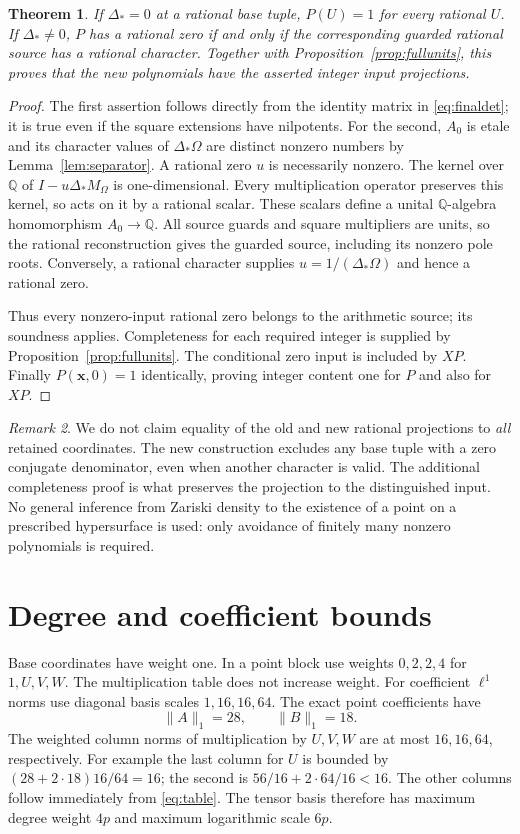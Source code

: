 \documentclass[11pt,a4paper]{article}
\newtheorem{theorem}{Theorem}[section]
\theoremstyle{remark}\newtheorem{remark}[theorem]{Remark}
\newcommand{\Q}{\mathbb Q}\newcommand{\Z}{\mathbb Z}\newcommand{\C}{\mathbb C}
\begin{document}
\begin{theorem}\label{thm:norm}
If $\Delta_*=0$ at a rational base tuple, $P(U)=1$ for every rational
$U$. If $\Delta_*\ne0$, $P$ has a rational zero if and only if the
corresponding guarded rational source has a rational character.
Together with Proposition~\ref{prop:fullunits}, this proves that the
new polynomials have the asserted integer input projections.
\end{theorem}
\begin{proof}
The first assertion follows directly from the identity matrix in
\eqref{eq:finaldet}; it is true even if the square extensions have
nilpotents. For the second, $A_0$ is etale and its character values of
$\Delta_*\Omega$ are distinct nonzero numbers by Lemma~\ref{lem:separator}.
A rational zero $u$ is necessarily nonzero. The kernel over $\Q$ of
$I-u\Delta_*M_\Omega$ is one-dimensional. Every multiplication
operator preserves this kernel, so acts on it by a rational scalar.
These scalars define a unital $\Q$-algebra homomorphism $A_0\to\Q$.
All source guards and square multipliers are units, so the rational
reconstruction gives the guarded source, including its nonzero pole
roots. Conversely, a rational character supplies
$u=1/(\Delta_*\Omega)$ and hence a rational zero.

Thus every nonzero-input rational zero belongs to the arithmetic source;
its soundness applies. Completeness for each required integer is supplied
by Proposition~\ref{prop:fullunits}. The conditional zero input is
included by $XP$. Finally $P(\boldsymbol x,0)=1$ identically, proving
integer content one for $P$ and also for $XP$.
\end{proof}

\begin{remark}
We do not claim equality of the old and new rational projections to
\emph{all} retained coordinates. The new construction excludes any
base tuple with a zero conjugate denominator, even when another
character is valid. The additional completeness proof is what preserves
the projection to the distinguished input. No general inference from
Zariski density to the existence of a point on a prescribed hypersurface
is used: only avoidance of finitely many nonzero polynomials is required.
\end{remark}

\section{Degree and coefficient bounds}\label{sec:bounds}
Base coordinates have weight one. In a point block use weights
$0,2,2,4$ for $1,U,V,W$. The multiplication table does not increase
weight. For coefficient $\ell^1$ norms use diagonal basis scales
$1,16,16,64$. The exact point coefficients have
\[
 \|A\|_1=28,\qquad \|B\|_1=18.
\]
The weighted column norms of multiplication by $U,V,W$ are at most
$16,16,64$, respectively. For example the last column for $U$ is
bounded by $(28+2\cdot18)16/64=16$; the second is
$56/16+2\cdot64/16<16$. The other columns follow immediately from
\eqref{eq:table}. The tensor basis therefore has maximum degree weight
$4p$ and maximum logarithmic scale $6p$.
\end{document}
